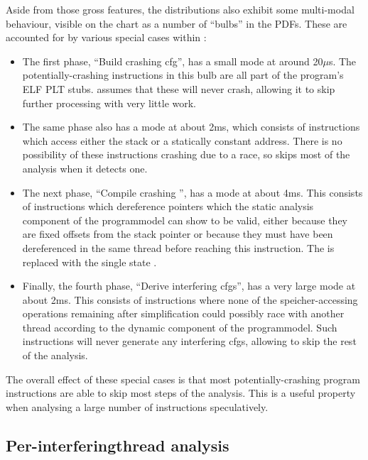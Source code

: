 Aside from those gross features, the distributions also exhibit some
multi-modal behaviour, visible on the chart as a number of ``bulbs''
in the PDFs.  These are accounted for by various special cases within
{\implementation}:
\begin{itemize}
\item The first phase, ``Build crashing \gls{cfg}'', has a small mode
  at around 20$\mu$s.  The potentially-crashing instructions in this
  bulb are all part of the program's ELF PLT stubs.  {\implementation}
  assumes that these will never crash, allowing it to skip further
  processing with very little work.
\item The same phase also has a mode at about 2ms, which consists of
  instructions which access either the stack or a statically constant
  address.  There is no possibility of these instructions crashing due
  to a race, so {\implementation} skips most of the analysis when it
  detects one.
\item The next phase, ``Compile crashing {\StateMachine}'', has a mode
  at about 4ms.  This consists of instructions which dereference
  pointers which the static analysis component of the
  \gls{programmodel} can show to be valid, either because they are
  fixed offsets from the stack pointer or because they must have been
  dereferenced in the same thread before reaching this instruction.
  The {\StateMachine} is replaced with the single state {\stSurvive}.
\item Finally, the fourth phase, ``Derive interfering \glspl{cfg}'',
  has a very large mode at about 2ms.  This consists of instructions
  where none of the \gls{speicher}-accessing operations remaining
  after {\StateMachine} simplification could possibly race with
  another thread according to the dynamic component of the
  \gls{programmodel}.  Such instructions will never generate any
  interfering \glspl{cfg}, allowing {\implementation} to skip the rest of
  the analysis.
\end{itemize}
The overall effect of these special cases is that most
potentially-crashing program instructions are able to skip most steps
of the analysis.  This is a useful property when analysing a large
number of instructions speculatively.

\subsection{Per-\gls{interferingthread} analysis}
\label{sect:eval:how:per_interfering}

